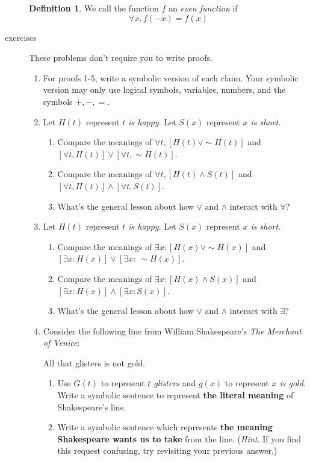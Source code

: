 \documentclass{letter}
\theoremstyle{definition}
\newtheorem*{definition}{Definition}
\begin{document}
\begin{description}
\begin{definition}
	We call the function $f$ an {\em even function} if $$\forall x, f(-x)=f(x)$$
\end{definition}
\item[exercises] These problems don't require you to write proofs.
\begin{enumerate}
	\item For proofs 1-5, write a symbolic version of each claim. Your symbolic version may only use logical symbols, variables, numbers, and the symbols $+,-,=$.
	\item Let $H(t)$ represent {\em $t$ is happy}. Let $S(x)$ represent {\em $x$ is short}.
		\begin{enumerate}
			\item Compare the meanings of $\forall t, \left[H(t)\vee \sim H(t)\right]$ and $\left[\forall t, H(t)\right] \vee \left[\forall t,\sim H(t)\right]$.
			\item Compare the meanings of $\forall t, \left[H(t)\wedge S(t)\right]$ and $\left[\forall t, H(t)\right]\wedge \left[\forall t, S(t)\right]$.
			\item What's the general lesson about how $\vee$ and $\wedge$ interact with $\forall$?
		\end{enumerate} 
	\item Let $H(t)$ represent {\em $t$ is happy}. Let $S(x)$ represent {\em $x$ is short}.
		\begin{enumerate}
			\item Compare the meanings of $\exists x:\left[H(x)\vee \sim H(x)\right]$ and $\left[\exists x: H(x)\right] \vee \left[\exists x:\ \sim H(x)\right]$.
			\item Compare the meanings of $\exists x: \left[H(x)\wedge S(x)\right]$ and $\left[\exists x: H(x)\right]\wedge \left[\exists x: S(x)\right]$.
			\item What's the general lesson about how $\vee$ and $\wedge$ interact with $\exists$?
		\end{enumerate}
		\item Consider the following line from William Shakespeare's {\em The Merchant of Venice}:
			\begin{center}{All that glisters is not gold.}\end{center}
			\begin{enumerate}
				\item Use $G(t)$ to represent {\em $t$ glisters} and $g(x)$ to represent {\em $x$ is gold}. Write a symbolic sentence to represent {\bfseries the literal meaning} of Shakespeare's line.
				\item Write a symbolic sentence which represents {\bfseries the meaning Shakespeare wants us to take} from the line. ({\em Hint.} If you find this request confusing, try revisiting your previous answer.)

\end{enumerate}
\end{enumerate}
\end{description}
\end{document}
